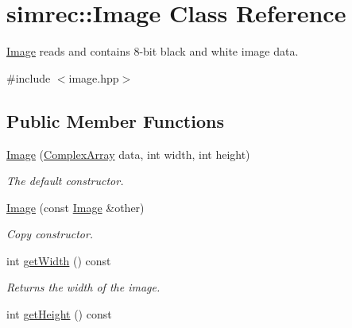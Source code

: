 \hypertarget{classsimrec_1_1Image}{\section{simrec\-:\-:\-Image \-Class \-Reference}
\label{classsimrec_1_1Image}
}


\hyperlink{classsimrec_1_1Image}{\-Image} reads and contains 8-\/bit black and white image data.  




{\ttfamily \#include $<$image.\-hpp$>$}

\subsection*{\-Public \-Member \-Functions}
\begin{DoxyCompactItemize}
\item 
\hyperlink{classsimrec_1_1Image_aeb265001e7c92c28379ea7b40cb6fea8}{\-Image} (\hyperlink{classsimrec_1_1ComplexArray}{\-Complex\-Array} data, int width, int height)
\begin{DoxyCompactList}\small\item\em \-The default constructor. \end{DoxyCompactList}\item 
\hypertarget{classsimrec_1_1Image_a5a3bc57bd7ba53f9ae55b1963b9ba0a1}{\hyperlink{classsimrec_1_1Image_a5a3bc57bd7ba53f9ae55b1963b9ba0a1}{\-Image} (const \hyperlink{classsimrec_1_1Image}{\-Image} \&other)}\label{classsimrec_1_1Image_a5a3bc57bd7ba53f9ae55b1963b9ba0a1}

\begin{DoxyCompactList}\small\item\em \-Copy constructor. \end{DoxyCompactList}\item 
\hypertarget{classsimrec_1_1Image_adbe5f8b9f79338c7eb6a66bdc69ca0b7}{int \hyperlink{classsimrec_1_1Image_adbe5f8b9f79338c7eb6a66bdc69ca0b7}{get\-Width} () const }\label{classsimrec_1_1Image_adbe5f8b9f79338c7eb6a66bdc69ca0b7}

\begin{DoxyCompactList}\small\item\em \-Returns the width of the image. \end{DoxyCompactList}\item 
\hypertarget{classsimrec_1_1Image_a45dd31ebd02682c5963858f62aa53dd9}{int \hyperlink{classsimrec_1_1Image_a45dd31ebd02682c5963858f62aa53dd9}{get\-Height} () const }\label{classsimrec_1_1Image_a45dd31ebd02682c5963858f62aa53dd9}


\end{DoxyCompactItemize}
